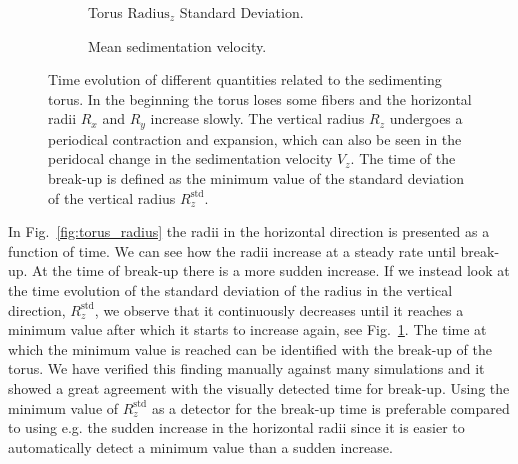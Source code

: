 \begin{figure}[htbp]
\begin{subfigure}[h]{.48\textwidth}
    \caption{Torus $\text{Radius}_z$ Standard Deviation.}\label{fig:torus_deviation}
  \end{subfigure}
  \begin{subfigure}[h]{.48\textwidth}
    \caption{Mean sedimentation velocity.}\label{fig:torus_velocity}
  \end{subfigure}
  \caption[Time evolution of the sedimenting torus.]{Time evolution of different quantities related to the sedimenting torus. In the beginning the torus loses some fibers and the horizontal radii $R_x$ and $R_y$ increase slowly. The vertical radius $R_z$ undergoes a periodical contraction and expansion, which can also be seen in the peridocal change in the sedimentation velocity $V_z$. The time of the break-up is defined as the minimum value of the standard deviation of the vertical radius $R_z^{\text{std}}$.}
  \label{fig:torus}
\end{figure}

In Fig.~\ref{fig:torus_radius} the radii in the horizontal direction is presented as a function of time. We can see how the radii increase at a steady rate until break-up. At the time of break-up there is a more sudden increase. If we instead look at the time evolution of the standard deviation of the radius in the vertical direction, $R_z^{\text{std}}$, we observe that it continuously decreases until it reaches a minimum value after which it starts to increase again, see Fig.~\ref{fig:torus_deviation}. The time at which the minimum value is reached can be identified with the break-up of the torus. We have verified this finding manually against many simulations and it showed a great agreement with the visually detected time for break-up. Using the minimum value of $R_z^{\text{std}}$ as a detector for the break-up time is preferable compared to using e.g. the sudden increase in the horizontal radii since it is easier to automatically detect a minimum value than a sudden increase.


